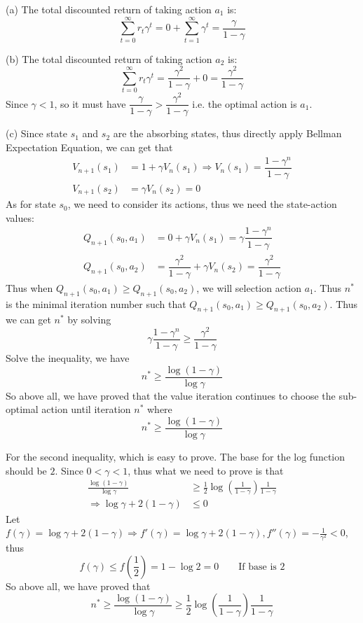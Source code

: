 \begin{homeworkProblem}
\solution

(a) The total discounted return of taking action $a_1$ is:
$$\sum_{t=0}^{\infty} r_t \gamma^t = 0 + \sum_{t=1}^{\infty} \gamma^t = \dfrac{\gamma}{1-\gamma}$$

(b) The total discounted return of taking action $a_2$ is:
$$\sum_{t=0}^{\infty} r_t \gamma^t = \frac{\gamma^2}{1-\gamma} + 0 = \dfrac{\gamma^2}{1-\gamma}$$
Since $\gamma < 1$, so it must have $\dfrac{\gamma}{1-\gamma}>\dfrac{\gamma^2}{1-\gamma}$ i.e. the optimal action is $a_1$.

(c) Since state $s_1$ and $s_2$ are the absorbing states, thus directly apply Bellman Expectation Equation, we can get that
\begin{align*}
V_{n+1}(s_1) &= 1 + \gamma V_n(s_1) \Rightarrow V_n(s_1)=\dfrac{1-\gamma^n}{1-\gamma} \\
V_{n+1}(s_2) &= \gamma V_n(s_2) = 0
\end{align*}
As for state $s_0$, we need to consider its actions, thus we need the state-action values:
\begin{align*}
Q_{n+1}(s_0, a_1) &= 0 + \gamma V_n(s_1) = \gamma \dfrac{1-\gamma^n}{1-\gamma} \\
Q_{n+1}(s_0, a_2) &= \dfrac{\gamma^2}{1-\gamma} + \gamma V_n(s_2) = \dfrac{\gamma^2}{1-\gamma}
\end{align*}
Thus when $Q_{n+1}(s_0, a_1)\geq Q_{n+1}(s_0, a_2)$, we will selection action $a_1$. Thus $n^*$ is the minimal iteration number such that $Q_{n+1}(s_0, a_1)\geq Q_{n+1}(s_0, a_2)$. Thus we can get $n^*$ by solving
$$\gamma \dfrac{1-\gamma^n}{1-\gamma} \geq \dfrac{\gamma^2}{1-\gamma}$$
Solve the inequality, we have
$$n^* \geq \dfrac{\log(1-\gamma)}{\log \gamma}$$
So above all, we have proved that the value iteration continues to choose the sub-optimal action until iteration $n^*$  where
$$n^* \geq \dfrac{\log(1-\gamma)}{\log \gamma}$$

For the second inequality, which is easy to prove. The base for the log function should be $2$. Since $0<\gamma<1$, thus what we need to prove is that
\begin{align*}
\frac{\log (1-\gamma)}{\log \gamma} &\geq \frac{1}{2} \log \left(\frac{1}{1-\gamma}\right) \frac{1}{1-\gamma} \\
\Rightarrow \log\gamma + 2(1-\gamma) &\leq 0
\end{align*}
Let $f(\gamma)=\log\gamma + 2(1-\gamma)\Rightarrow f'(\gamma)=\log\gamma+2(1-\gamma), f''(\gamma)=-\frac{1}{\gamma^2}<0$, thus
$$f(\gamma)\leq f\left(\frac{1}{2}\right)=1 - \log 2 = 0\qquad\text{If base is $2$}$$
So above all, we have proved that
$$n^* \geq \frac{\log (1-\gamma)}{\log \gamma} \geq \frac{1}{2} \log \left(\frac{1}{1-\gamma}\right) \frac{1}{1-\gamma}$$

\end{homeworkProblem}

\newpage